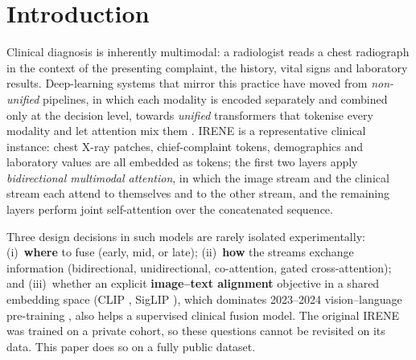 \section{Introduction}
Clinical diagnosis is inherently multimodal: a radiologist reads a chest radiograph in the
context of the presenting complaint, the history, vital signs and laboratory results.
Deep-learning systems that mirror this practice have moved from \emph{non-unified} pipelines,
in which each modality is encoded separately and combined only at the decision level, towards
\emph{unified} transformers that tokenise every modality and let attention mix them
\citep{huang2020fusion,acosta2022multimodal,xu2023mmtsurvey}. IRENE \citep{zhou2023irene} is a
representative clinical instance: chest X-ray patches, chief-complaint tokens, demographics and
laboratory values are all embedded as tokens; the first two layers apply \emph{bidirectional
multimodal attention}, in which the image stream and the clinical stream each attend to
themselves and to the other stream, and the remaining layers perform joint self-attention over
the concatenated sequence.

Three design decisions in such models are rarely isolated experimentally:
(i)~\textbf{where} to fuse (early, mid, or late);
(ii)~\textbf{how} the streams exchange information (bidirectional, unidirectional, co-attention,
gated cross-attention); and
(iii)~whether an explicit \textbf{image--text alignment} objective in a shared embedding space
(CLIP \citep{radford2021clip}, SigLIP \citep{zhai2023siglip}), which dominates 2023--2024
vision--language pre-training \citep{li2023blip2,girdhar2023imagebind,zhang2023biomedclip,you2023cxrclip},
also helps a supervised clinical fusion model. The original IRENE was trained on a private
cohort, so these questions cannot be revisited on its data. This paper does so on a fully public
dataset.

